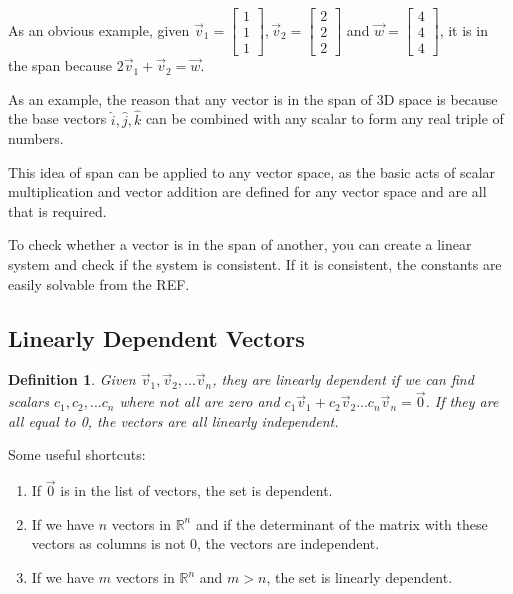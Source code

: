 \documentclass{article}
\newtheorem{definition}{Definition}
\begin{document}
As an obvious example, given $\vec{v}_1=\begin{bmatrix}1\\1\\1 \end{bmatrix}, \vec{v}_2=\begin{bmatrix}2\\2\\2\end{bmatrix}$ and
$\vec{w}=\begin{bmatrix}4\\4\\4\end{bmatrix}$, it is in the span because $2\vec{v}_1+\vec{v}_2=\vec{w}$.

As an example, the reason that any vector is in the span of 3D space is because the base vectors $\hat{i}, \hat{j}, \hat{k}$ 
can be combined with any scalar to form any real triple of numbers.

This idea of span can be applied to any vector space, as the basic acts of scalar multiplication and vector addition are defined for 
any vector space and are all that is required.

To check whether a vector is in the span of another, you can create a linear system and check if the system is consistent. If it is 
consistent, the constants are easily solvable from the REF.

\subsection{Linearly Dependent Vectors}

\begin{definition}
	Given $\vec{v}_1,\vec{v}_2,...\vec{v}_n$, they are linearly dependent if we can find scalars $c_1,c_2,...c_n$ where not all 
	are zero and $c_1\vec{v}_1+c_2\vec{v}_2...c_n\vec{v}_n=\vec{0}$. If they are all equal to 0, the vectors are all linearly 
	independent.
\end{definition}

Some useful shortcuts:
\begin{enumerate}
	\item If $\vec{0}$ is in the list of vectors, the set is dependent.
	\item If we have $n$ vectors in $\mathbb{R}^n$ and if the determinant of the matrix with these vectors as columns is not 0,
		the vectors are independent.
	\item If we have $m$ vectors in $\mathbb{R}^n$ and $m>n$, the set is linearly dependent.
\end{enumerate}
\end{document}
